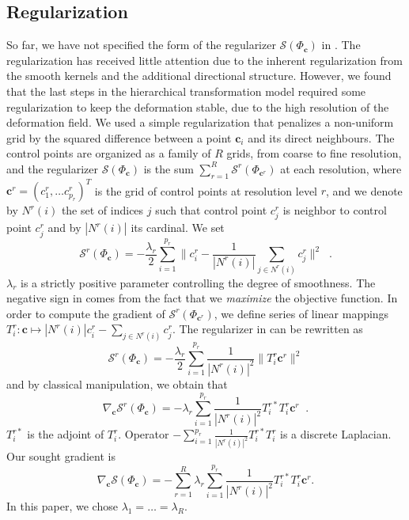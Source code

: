 \documentclass[twocolumn]{svjour3}
\begin{document}
\subsection{Regularization}
\label{sec:reg}
So far, we have not specified the form of the regularizer $\mathcal S(\Phi_{\bm c})$ in
.  The regularization has received little attention due to the inherent
regularization from the smooth kernels and the additional directional structure. However,
we found that the last steps in the hierarchical transformation model required some
regularization to keep the deformation stable, due to the high resolution of the
deformation field. We used a simple regularization that penalizes a non-uniform grid by
the squared difference between a point $\bm c_i$ and its direct neighbours. The control
points are organized as a family of $R$ grids, from coarse to fine resolution, and the
regularizer $\mathcal S(\Phi_{\bm c})$ is the sum
$\sum_{r = 1}^R \mathcal{S}^r(\Phi_{\bm c^r})$ at each resolution, where
$\bm c^r = (c^r_1,\dots c^r_{p_r})^T$ is the grid of control points at resolution level
$r$, and we denote by $N^r(i)$ the set of indices $j$ such that control point $c^r_j$ is
neighbor to control point $c^r_j$ and by $|N^r(i)|$ its cardinal. We set
\begin{equation}
    \label{eq:regularizer}
    \mathcal{S}^r(\Phi_{\bm c})= -\frac{\lambda_r}{2}\sum_{i=1}^{p_r} \|c^r_i - \frac{1}{|N^r(i)|}\sum_{j\in N^r(i)} c^r_j\|^2\;\; .
\end{equation}
$\lambda_r$ is a strictly positive parameter controlling the degree of smoothness. The negative sign in  comes from the fact that we \emph{maximize} the objective function. In order to compute the gradient of $\mathcal{S}^r(\Phi_{\bm c^r})$, we define series of linear mappings $T^r_i:\bm c\mapsto |N^r(i)|c^r_i - \sum_{j\in N^r(i)}c^r_j$. The regularizer in  can be rewritten as
\begin{equation}
\mathcal{S}^r(\Phi_{\bm c})=-\frac{\lambda_r}{2}\sum_{i=1}^{p_r}\frac{1}{|N^r(i)|^2}\|T^r_i\bm c^r\|^2
\end{equation}
and by classical manipulation, we obtain that
\begin{equation}
    \label{eq:reggradient}
    \nabla_{\bm c}\mathcal{S}^r(\Phi_{\bm c}) = -\lambda_r\sum_{i=1}^{p_r}\frac{1}{|N^r(i)|^2}T_i^{r*} T_i^r\bm c^r \;\; .
\end{equation}
$T^{r*}_i$ is the adjoint of $T^r_i$. Operator $-\sum_{i=1}^{p_r}\frac{1}{|N^r(i)|^2}T_i^{r*} T^r_i$ is a discrete Laplacian. Our sought gradient is
\begin{equation}
    \nabla_{\bm c}\mathcal{S}(\Phi_{\bm c}) = -\sum_{r = 1}^R\lambda_r\sum_{i=1}^{p_r}\frac{1}{|N^r(i)|^2} T_i^{r*} T^r_i\bm c^r.
\end{equation}
In this paper, we chose $\lambda_1=\dots=\lambda_R$.
\end{document}
